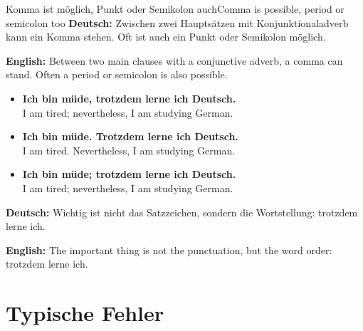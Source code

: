 \documentclass[a4paper,11pt]{article}
\newcommand{\GermanText}[1]{\textbf{Deutsch: }#1\par}
\newcommand{\EnglishText}[1]{{\small\color{SoftGray}\textbf{English: }#1\par}}
\newcommand{\ExampleItem}[2]{\item \textbf{#1}\\{\small\color{SoftGray}#2}}
\begin{document}
        \begin{grammarentry}{Komma ist möglich, Punkt oder Semikolon auch}{Comma is possible, period or semicolon too}
            \GermanText{Zwischen zwei Hauptsätzen mit Konjunktionaladverb kann ein Komma stehen. Oft ist auch ein Punkt oder Semikolon möglich.}
            \EnglishText{Between two main clauses with a conjunctive adverb, a comma can stand. Often a period or semicolon is also possible.}
            
            \begin{exbox}
                \begin{itemize}
                    \ExampleItem{Ich bin müde, trotzdem lerne ich Deutsch.}{I am tired; nevertheless, I am studying German.}
                    \ExampleItem{Ich bin müde. Trotzdem lerne ich Deutsch.}{I am tired. Nevertheless, I am studying German.}
                    \ExampleItem{Ich bin müde; trotzdem lerne ich Deutsch.}{I am tired; nevertheless, I am studying German.}
                \end{itemize}
            \end{exbox}
            
            \GermanText{Wichtig ist nicht das Satzzeichen, sondern die Wortstellung: trotzdem lerne ich.}
            \EnglishText{The important thing is not the punctuation, but the word order: trotzdem lerne ich.}
        \end{grammarentry}
    
    
    \section{Typische Fehler}
        
\end{document}
